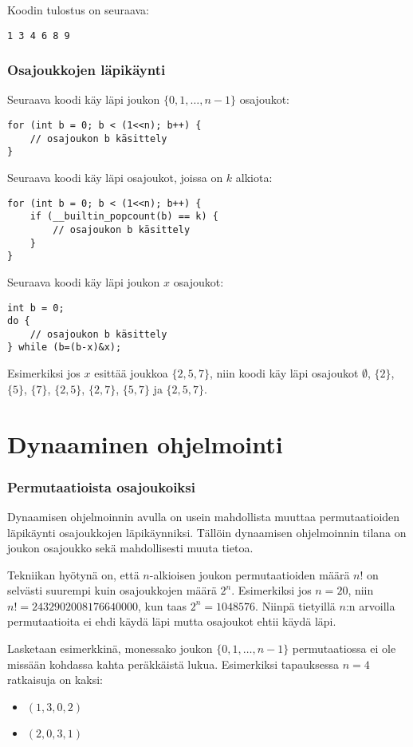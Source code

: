 Koodin tulostus on seuraava:
\begin{lstlisting}
1 3 4 6 8 9
\end{lstlisting}

\subsubsection{Osajoukkojen läpikäynti}

Seuraava koodi käy läpi joukon $\{0,1,\ldots,n-1\}$ osajoukot:

\begin{lstlisting}
for (int b = 0; b < (1<<n); b++) {
    // osajoukon b käsittely
}
\end{lstlisting}
Seuraava koodi käy läpi
osajoukot, joissa on $k$ alkiota:
\begin{lstlisting}
for (int b = 0; b < (1<<n); b++) {
    if (__builtin_popcount(b) == k) {
        // osajoukon b käsittely
    }
}
\end{lstlisting}
Seuraava koodi käy läpi joukon $x$ osajoukot:
\begin{lstlisting}
int b = 0;
do {
    // osajoukon b käsittely
} while (b=(b-x)&x);
\end{lstlisting}
Esimerkiksi jos $x$ esittää joukkoa $\{2,5,7\}$,
niin koodi käy läpi osajoukot
$\emptyset$, $\{2\}$, $\{5\}$, $\{7\}$,
$\{2,5\}$, $\{2,7\}$, $\{5,7\}$ ja $\{2,5,7\}$.

\section{Dynaaminen ohjelmointi}

\subsubsection{Permutaatioista osajoukoiksi}

Dynaamisen ohjelmoinnin avulla on usein mahdollista
muuttaa permutaatioiden läpikäynti osajoukkojen läpikäynniksi.
Tällöin dynaamisen ohjelmoinnin tilana on
joukon osajoukko sekä mahdollisesti muuta tietoa.

Tekniikan hyötynä on,
että $n$-alkioisen joukon permutaatioiden määrä $n!$
on selvästi suurempi kuin osajoukkojen määrä $2^n$.
Esimerkiksi jos $n=20$, niin $n!=2432902008176640000$,
kun taas $2^n=1048576$.
Niinpä tietyillä $n$:n arvoilla permutaatioita ei ehdi
käydä läpi mutta osajoukot ehtii käydä läpi.

Lasketaan esimerkkinä, monessako
joukon $\{0,1,\ldots,n-1\}$
permutaatiossa ei ole 
missään kohdassa kahta peräkkäistä lukua.
Esimerkiksi tapauksessa $n=4$ ratkaisuja on kaksi:
\begin{itemize}
\item $(1,3,0,2)$
\item $(2,0,3,1)$
\end{itemize}

